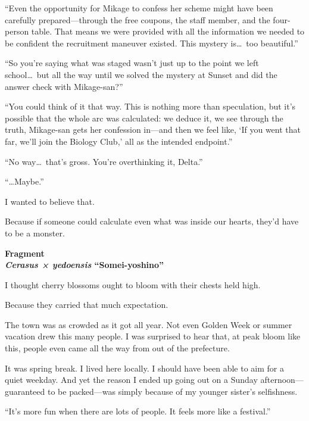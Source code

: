 \documentclass[
    a4paper,
    12pt,
    twoside,
    openany,
    UTF8,
    fontset=windows
]{ctexbook}
\begin{document}
``Even the opportunity for Mikage to confess her scheme might have been carefully prepared---through the free coupons, the staff member, and the four-person table. That means we were provided with all the information we needed to be confident the recruitment maneuver existed. This mystery is\dots\ too beautiful.''

``So you're saying what was staged wasn't just up to the point we left school\dots\ but all the way until we solved the mystery at Sunset and did the answer check with Mikage-san?''

``You could think of it that way. This is nothing more than speculation, but it's possible that the whole arc was calculated: we deduce it, we see through the truth, Mikage-san gets her confession in---and then we feel like, `If you went that far, we'll join the Biology Club,' all as the intended endpoint.''

``No way\dots\ that's gross. You're overthinking it, Delta.''

``\dots Maybe.''

I wanted to believe that.

Because if someone could calculate even what was inside our hearts, they'd have to be a monster.

\clearpage
\thispagestyle{plain}
\begin{center}
    \large\bfseries
    Fragment\\
    \textit{Cerasus × yedoensis} ``Somei-yoshino''
\end{center}
\label{sec:fragment1}
\vspace{1cm}

I thought cherry blossoms ought to bloom with their chests held high.

Because they carried that much expectation.

The town was as crowded as it got all year. Not even Golden Week or summer vacation drew this many people. I was surprised to hear that, at peak bloom like this, people even came all the way from out of the prefecture.

It was spring break. I lived here locally. I should have been able to aim for a quiet weekday. And yet the reason I ended up going out on a Sunday afternoon---guaranteed to be packed---was simply because of my younger sister's selfishness.

``It's more fun when there are lots of people. It feels more like a festival.''
\end{document}
